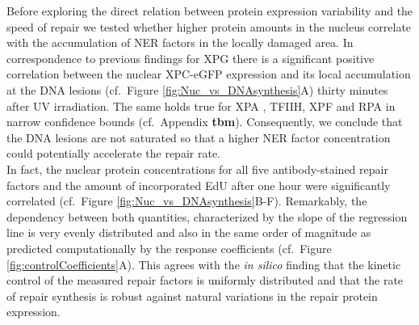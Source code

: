 Before exploring the direct relation between protein expression variability and the speed of repair we tested whether higher protein amounts in the nucleus correlate with the accumulation of NER factors in the locally damaged area. In correspondence to previous findings for XPG \cite{Luijsterburg2010} there is a significant positive correlation between the nuclear XPC-eGFP expression and its local accumulation at the DNA lesions (cf.\ Figure \ref{fig:Nuc_vs_DNAsynthesis}A) thirty minutes after UV irradiation. The same holds true for XPA \cite{Verbruggen2014}, TFIIH, XPF and RPA in narrow confidence bounds (cf.\ Appendix \textbf{tbm}). Consequently, we conclude that the DNA lesions are not saturated so that a higher NER factor concentration could potentially accelerate the repair rate.\\
In fact, the nuclear protein concentrations for all five antibody-stained repair factors and the amount of incorporated EdU after one hour were significantly correlated (cf.\ Figure \ref{fig:Nuc_vs_DNAsynthesis}B-F). Remarkably, the dependency between both quantities, characterized by the slope of the regression line is very evenly distributed and also in the same order of magnitude as predicted computationally by the response coefficients (cf.\ Figure \ref{fig:controlCoefficients}A). This agrees with the \textit{in silico} finding that the kinetic control of the measured repair factors is uniformly distributed and that the rate of repair synthesis is robust against natural variations in the repair protein expression.    
       
